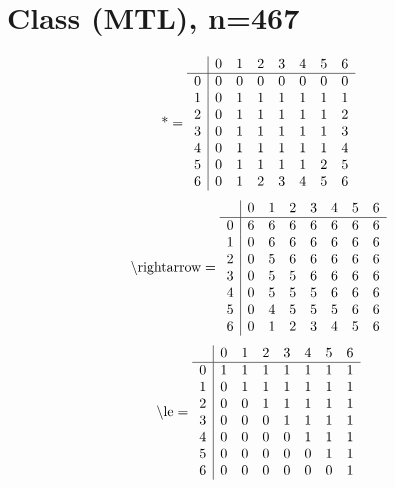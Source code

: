 \documentclass[11pt]{article}
\begin{document}
\section{Class (MTL), n=467}
\[\text{*} = 
\begin{array}{r | r r r r r r r}
 & 0 & 1 & 2 & 3 & 4 & 5 & 6 \\ \hline
0 & 0 & 0 & 0 & 0 & 0 & 0 & 0 \\
1 & 0 & 1 & 1 & 1 & 1 & 1 & 1 \\
2 & 0 & 1 & 1 & 1 & 1 & 1 & 2 \\
3 & 0 & 1 & 1 & 1 & 1 & 1 & 3 \\
4 & 0 & 1 & 1 & 1 & 1 & 1 & 4 \\
5 & 0 & 1 & 1 & 1 & 1 & 2 & 5 \\
6 & 0 & 1 & 2 & 3 & 4 & 5 & 6 \\
\end{array}
\]
\[\text{\textbackslash rightarrow} = 
\begin{array}{r | r r r r r r r}
 & 0 & 1 & 2 & 3 & 4 & 5 & 6 \\ \hline
0 & 6 & 6 & 6 & 6 & 6 & 6 & 6 \\
1 & 0 & 6 & 6 & 6 & 6 & 6 & 6 \\
2 & 0 & 5 & 6 & 6 & 6 & 6 & 6 \\
3 & 0 & 5 & 5 & 6 & 6 & 6 & 6 \\
4 & 0 & 5 & 5 & 5 & 6 & 6 & 6 \\
5 & 0 & 4 & 5 & 5 & 5 & 6 & 6 \\
6 & 0 & 1 & 2 & 3 & 4 & 5 & 6 \\
\end{array}
\]
\[\text{\textbackslash le} = 
\begin{array}{r | r r r r r r r}
 & 0 & 1 & 2 & 3 & 4 & 5 & 6 \\ \hline
0 & 1 & 1 & 1 & 1 & 1 & 1 & 1 \\
1 & 0 & 1 & 1 & 1 & 1 & 1 & 1 \\
2 & 0 & 0 & 1 & 1 & 1 & 1 & 1 \\
3 & 0 & 0 & 0 & 1 & 1 & 1 & 1 \\
4 & 0 & 0 & 0 & 0 & 1 & 1 & 1 \\
5 & 0 & 0 & 0 & 0 & 0 & 1 & 1 \\
6 & 0 & 0 & 0 & 0 & 0 & 0 & 1 \\
\end{array}
\]
\end{document}
